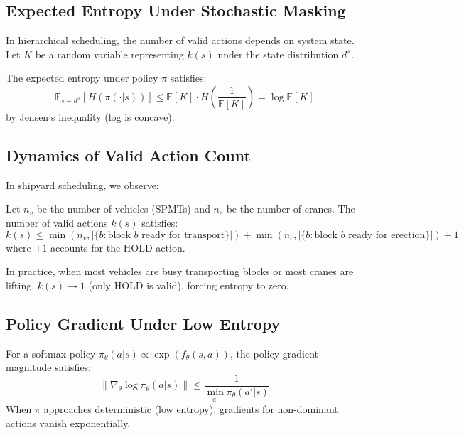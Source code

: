 \subsection{Expected Entropy Under Stochastic Masking}

In hierarchical scheduling, the number of valid actions depends on system state. Let $K$ be a random variable representing $k(s)$ under the state distribution $d^\pi$.

\begin{theorem}
\label{thm:expected_entropy}
The expected entropy under policy $\pi$ satisfies:
\begin{equation}
\mathbb{E}_{s \sim d^\pi}[H(\pi(\cdot|s))] \leq \mathbb{E}[K] \cdot H\left(\frac{1}{\mathbb{E}[K]}\right) = \log \mathbb{E}[K]
\end{equation}
by Jensen's inequality (log is concave).
\end{theorem}

\subsection{Dynamics of Valid Action Count}

In shipyard scheduling, we observe:

\begin{lemma}
Let $n_v$ be the number of vehicles (SPMTs) and $n_c$ be the number of cranes. The number of valid actions $k(s)$ satisfies:
\begin{equation}
k(s) \leq \min(n_v, |\{b : \text{block } b \text{ ready for transport}\}|) + \min(n_c, |\{b : \text{block } b \text{ ready for erection}\}|) + 1
\end{equation}
where $+1$ accounts for the HOLD action.
\end{lemma}

In practice, when most vehicles are busy transporting blocks or most cranes are lifting, $k(s) \to 1$ (only HOLD is valid), forcing entropy to zero.

\subsection{Policy Gradient Under Low Entropy}

\begin{theorem}
\label{thm:gradient_vanishing}
For a softmax policy $\pi_\theta(a|s) \propto \exp(f_\theta(s,a))$, the policy gradient magnitude satisfies:
\begin{equation}
\|\nabla_\theta \log \pi_\theta(a|s)\| \leq \frac{1}{\min_{a'} \pi_\theta(a'|s)}
\end{equation}
When $\pi$ approaches deterministic (low entropy), gradients for non-dominant actions vanish exponentially.
\end{theorem}

